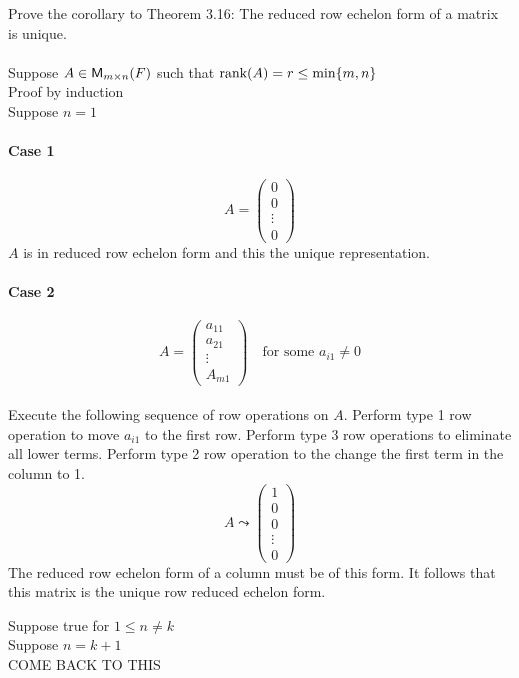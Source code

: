 Prove the corollary to Theorem 3.16: The reduced row echelon form of a
matrix is unique. 
\paragraph{} Suppose $A \in \mathsf{M}_{m \times n}(F)$ such that $\text{rank}({A}) = r
\leq\text{min}\{m,n\}$
\\Proof by induction 
\\Suppose $n=1$ 
\paragraph{Case 1}
\begin{equation}
A = \begin{pmatrix} 0 \\ 0 \\ \vdots \\ 0\end{pmatrix}
\end{equation}
$A$ is in reduced row echelon form and this the unique representation.
\paragraph{Case 2}
\begin{equation}
A = \begin{pmatrix}a_{11}\\a_{21}\\\vdots\\A_{m1}\end{pmatrix} \quad
\text{for some } a_{i1} \neq 0
\end{equation}
\paragraph{} Execute the following sequence of row operations on
$A$. Perform type 1 row operation to move $a_{i1}$ to the first
row. Perform type 3 row operations to eliminate all lower
terms. Perform type 2 row operation to the change the first term in
the column to 1.
\begin{equation}
A \leadsto \begin{pmatrix}1\\0\\0\\\vdots\\0\end{pmatrix}
\end{equation}
The reduced row echelon form of a column must be of this form. It
follows that this matrix is the unique row reduced echelon form.

Suppose true for $1\leq n \neq k$
\\Suppose $n = k+1$
\\{\huge COME BACK TO THIS}

